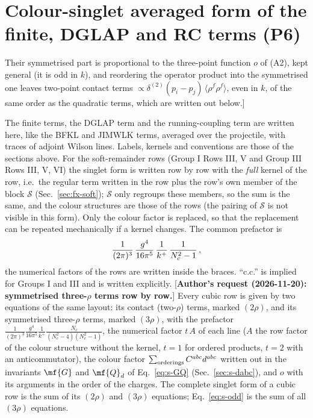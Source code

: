 {\color{red}
\section{Colour-singlet averaged form of the finite, DGLAP and RC terms (P6)}\label{sec:singlet}
\noindent[\textbf{New section; fix P6} (\texttt{fix\_singlet.tex}, taken over with the kernel definitions adapted to this file). \textbf{Correction of a statement of the brief and of the reviews:} the cubic (three-$\rho$) terms do \emph{not} vanish after the average over a colour-singlet projectile. [\textbf{Reworded, author's request (2026-11-20): no model is used}; previously: ``over a Gaussian (or any colour-singlet) projectile; only their symmetrised part does''.] Their symmetrised part is proportional to the three-point function $o$ of (A2), kept general (it is odd in $k$), and reordering the operator product into the symmetrised one leaves two-point contact terms $\propto\delta^{(2)}(p_{i}-p_{j})\,\langle\rho^{f}\rho^{f}\rangle$, even in $k$, of the same order as the quadratic terms, which are written out below.]\par
\noindent The finite terms, the DGLAP term and the running-coupling term are written here, like the BFKL and JIMWLK terms, averaged over the projectile, with traces of adjoint Wilson lines. Labels, kernels and conventions are those of the sections above. For the soft-remainder rows (Group I Rows III, V and Group III Rows III, V, VI) the singlet form is written row by row with the \emph{full} kernel of the row, i.e.\ the regular term written in the row plus the row's own member of the block $\mathcal{S}$ (Sec.~\ref{sec:fx-soft}); $\mathcal{S}$ only regroups these members, so the sum is the same, and the colour structures are those of the rows (the pairing of $\mathcal{S}$ is not visible in this form). Only the colour factor is replaced, so that the replacement can be repeated mechanically if a kernel changes. The common prefactor is
\begin{align}
\frac{1}{(2\pi)^{3}}\,\frac{g^{4}}{16\pi^{5}}\,\frac{1}{k^{+}}\,\frac{1}{N_{c}^{2}-1}\,,\notag
\end{align}
the numerical factors of the rows are written inside the braces. ``c.c.'' is implied for Groups I and III and is written explicitly. [\textbf{Author's request (2026-11-20): symmetrised three-$\rho$ terms row by row.}] Every cubic row is given by two equations of the same layout: its contact (two-$\rho$) terms, marked $(2\rho)$, and its symmetrised three-$\rho$ terms, marked $(3\rho)$, with the prefactor $\frac{1}{(2\pi)^{3}}\frac{g^{4}}{16\pi^{5}}\frac{1}{k^{+}}\frac{N_{c}}{(N_{c}^{2}-4)(N_{c}^{2}-1)}$, the numerical factor $t\,A$ of each line ($A$ the row factor of the colour structure without the kernel, $t=1$ for ordered products, $t=2$ with an anticommutator), the colour factor $\sum_{\rm orderings}C^{abc}d^{abc}$ written out in the invariants $\mf{G}$ and $\mf{Q}_{d}$ of Eq.~\eqref{eq:s-GQ} (Sec.~\ref{sec:s-dabc}), and $o$ with its arguments in the order of the charges. The complete singlet form of a cubic row is the sum of its $(2\rho)$ and $(3\rho)$ equations; Eq.~\eqref{eq:s-odd} is the sum of all $(3\rho)$ equations.

}
